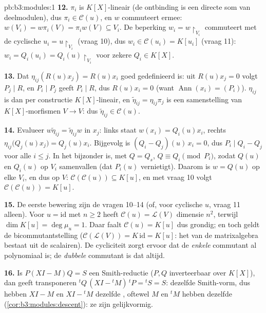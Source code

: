 \begin{solution}{pb:b3:modules:1}
\textbf{12.} $\pi_i$ is $K[X]$-lineair (de ontbinding is een
directe som van deelmodulen), dus $\pi_i \in \mathcal C(u)$, en
$w$ commuteert ermee: $w(V_i) = w\pi_i(V) = \pi_i w(V) \subseteq
V_i$. De beperking $w_i = w\restriction_{V_i}$ commuteert met de
cyclische $u_i = u\restriction_{V_i}$ (vraag 10), dus $w_i \in
\mathcal C(u_i) = K[u_i]$ (vraag 11): $w_i = Q_i(u_i) =
Q_i(u)\restriction_{V_i}$ voor zekere $Q_i \in K[X]$.

\textbf{13.} Dat $\eta_{ij}(R(u)x_j) = R(u)x_i$ goed gedefinieerd
is: uit $R(u)x_j = 0$ volgt $P_j \mid R$, en $P_i \mid P_j$ geeft
$P_i \mid R$, dus $R(u)x_i = 0$ (want $\operatorname{Ann}(x_i) =
(P_i)$). $\eta_{ij}$ is dan per constructie $K[X]$-lineair, en
$\tilde\eta_{ij} = \eta_{ij}\pi_j$ is een samenstelling van
$K[X]$-morfismen $V \to V$: dus $\tilde\eta_{ij} \in \mathcal
C(u)$.

\textbf{14.} Evalueer $w\tilde\eta_{ij} = \tilde\eta_{ij}w$ in
$x_j$: links staat $w(x_i) = Q_i(u)x_i$, rechts
$\eta_{ij}\bigl(Q_j(u)x_j\bigr) = Q_j(u)x_i$. Bijgevolg is $(Q_i -
Q_j)(u)\,x_i = 0$, dus $P_i \mid Q_i - Q_j$ voor alle $i \leq j$.
In het bijzonder is, met $Q = Q_s$, $Q \equiv Q_i \pmod{P_i}$,
zodat $Q(u)$ en $Q_i(u)$ op $V_i$ samenvallen (dat $P_i(u)$
vernietigt). Daarom is $w = Q(u)$ op elke $V_i$, en dus op $V$:
$\mathcal C(\mathcal C(u)) \subseteq K[u]$, en met vraag 10 volgt
$\mathcal C(\mathcal C(u)) = K[u]$.

\textbf{15.} De eerste bewering zijn de vragen 10--14 (of, voor
cyclische $u$, vraag 11 alleen). Voor $u = \mathrm{id}$ met $n
\geq 2$ heeft $\mathcal C(u) = \mathcal L(V)$ dimensie $n^2$,
terwijl $\dim K[u] = \deg\mu_u = 1$. Daar faalt $\mathcal C(u) =
K[u]$ dus grondig; en toch geldt de bicommutantstelling
($\mathcal C(\mathcal L(V)) = K\,\mathrm{id} = K[u]$: het 
van de matrixalgebra bestaat uit de scalairen). De cycliciteit
zorgt ervoor dat de \emph{enkele} commutant al polynomiaal is; de
\emph{dubbele} commutant is dat altijd.

\textbf{16.} Is $P(XI - M)Q = S$ een Smith-reductie ($P, Q$
inverteerbaar over $K[X]$), dan geeft transponeren ${}^tQ\,(XI -
{}^tM)\,{}^tP = {}^tS = S$: dezelfde Smith-vorm, dus hebben $XI -
M$ en $XI - {}^tM$ dezelfde , oftewel $M$ en
${}^tM$ hebben dezelfde 
(\cref{cor:b3:modules:descent}): ze zijn gelijkvormig.


\end{solution}

